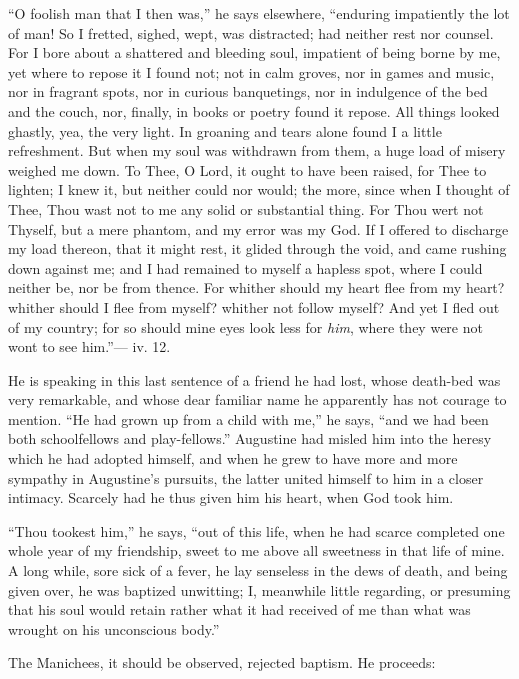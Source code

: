 ``O foolish man that I then was,'' he says elsewhere,
``enduring impatiently the lot of man! So I fretted, sighed, wept,
was distracted; had neither rest nor counsel. For I bore about a
shattered and bleeding soul, impatient of being borne by me, yet where
to repose it I found not; not in calm groves, nor in games and music,
nor in fragrant spots, nor in curious banquetings, nor in indulgence
of the bed and the couch, nor, finally, in books or poetry found it
repose. All things looked ghastly, yea, the very light. In groaning
and tears alone found I a little refreshment. But
when my soul was withdrawn from them, a huge load of misery weighed me
down. To Thee, O Lord, it ought to have been raised, for Thee to
lighten; I knew it, but neither could nor would; the more, since when
I thought of Thee, Thou wast not to me any solid or substantial thing.
For Thou wert not Thyself, but a mere phantom, and my error was my
God. If I offered to discharge my load thereon, that it might rest, it
glided through the void, and came rushing down against me; and I had
remained to myself a hapless spot, where I could neither be, nor be
from thence. For whither should my heart flee from my heart? whither
should I flee from myself? whither not follow myself? And yet I fled
out of my country; for so should mine eyes look less for \emph{him},
where they were not wont to see him.''— iv. 12.

He is speaking in this last sentence of a friend he had lost, whose
death-bed was very remarkable, and whose dear familiar name he
apparently has not courage to mention. ``He had grown up from a
child with me,'' he says, ``and we had been both schoolfellows
and play-fellows.'' Augustine had misled him into the heresy which
he had adopted himself, and when he grew to have more and more
sympathy in Augustine's pursuits, the latter united himself to him in
a closer intimacy. Scarcely had he thus given him his heart, when God
took him.

``Thou tookest him,'' he says, ``out of this life, when
he had scarce completed one whole year of my friendship, sweet to me
above all sweetness in that life of mine. A long while, sore sick of a
fever, he lay senseless in the dews of death, and being given over, he
was baptized unwitting; I, meanwhile little regarding, or presuming
that his soul would retain rather what it had received of me than what
was wrought on his unconscious body.''

The Manichees, it should be observed, rejected baptism. He
proceeds:


